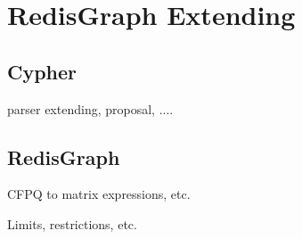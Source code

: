 \section{RedisGraph Extending}

\subsection{Cypher}

parser extending, proposal, ....

\subsection{RedisGraph}

CFPQ to matrix expressions, etc. 

Limits, restrictions, etc. 